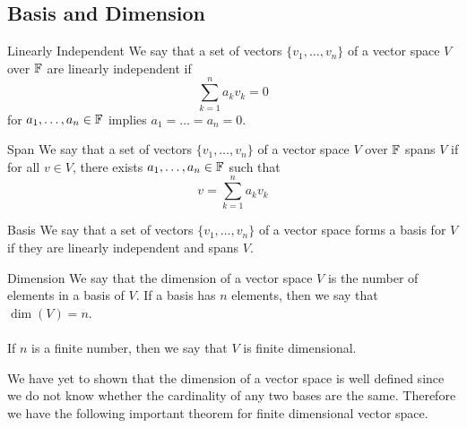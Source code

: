 \documentclass[a4paper]{article}
\begin{document}
\subsection{Basis and Dimension}
\begin{defn}{Linearly Independent}{} We say that a set of vectors $\{v_1,\dots,v_n\}$ of a vector space $V$ over $\mathbb{F}$ are linearly independent if $$\sum_{k=1}^na_kv_k=0$$ for $a_1,\dots,a_n\in\mathbb{F}$ implies $a_1=\dots=a_n=0$. 
\end{defn}

\begin{defn}{Span}{} We say that a set of vectors $\{v_1,\dots,v_n\}$ of a vector space $V$ over $\mathbb{F}$ spans $V$ if for all $v\in V$, there exists $a_1,\dots,a_n\in\mathbb{F}$ such that $$v=\sum_{k=1}^na_kv_k$$
\end{defn}

\begin{defn}{Basis}{} We say that a set of vectors $\{v_1,\dots,v_n\}$ of a vector space forms a basis for $V$ if they are linearly independent and spans $V$. 
\end{defn}

\begin{defn}{Dimension}{} We say that the dimension of a vector space $V$ is the number of elements in a basis of $V$. If a basis has $n$ elements, then we say that $\dim(V)=n$. \\~\\
If $n$ is a finite number, then we say that $V$ is finite dimensional. 
\end{defn}

We have yet to shown that the dimension of a vector space is well defined since we do not know whether the cardinality of any two bases are the same. Therefore we have the following important theorem for finite dimensional vector space. 
\end{document}
